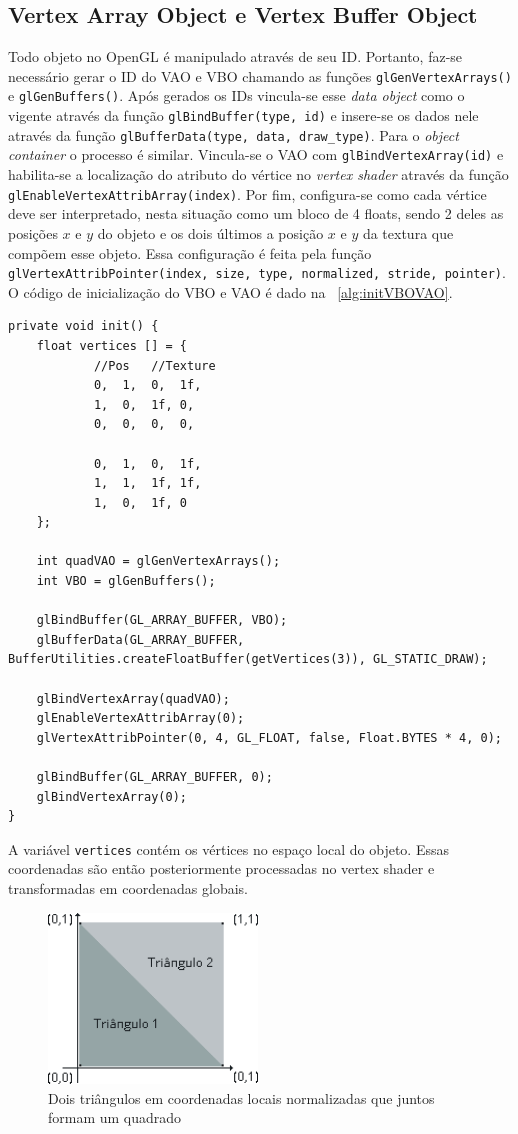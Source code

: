 \documentclass[12pt, 
openright, 
oneside, 
a4paper,    
brazil]{facom-ufu-abntex2}
\begin{document}
\subsection{Vertex Array Object e Vertex Buffer Object}
Todo objeto no OpenGL é manipulado através de seu ID. Portanto, faz-se necessário gerar o ID do VAO e VBO chamando as funções \texttt{glGenVertexArrays()} e \linebreak \texttt{glGenBuffers()}. Após gerados os IDs vincula-se esse \textit{data object} como o vigente através da função \texttt{glBindBuffer}\texttt{(type, id)} e insere-se os dados nele através da função \texttt{glBufferData(type, data, draw_type)}. Para o \textit{object container} o processo é similar. Vincula-se o VAO com \texttt{glBindVertexArray(id)} e habilita-se a localização do atributo do vértice no \textit{vertex shader} através da função \texttt{glEnableVertexAttribArray(index)}. Por fim, configura-se como cada vértice deve ser interpretado, nesta situação como um bloco de 4 floats, sendo 2 deles as posições $x$ e $y$ do objeto e os dois últimos a posição $x$ e $y$ da textura que compõem esse objeto. Essa configuração é feita pela função \texttt{glVertexAttribPointer(index, size, type, normalized, stride, pointer)}. O código de inicialização do VBO e VAO é dado na \lstlistingname~\ref{alg:initVBOVAO}.

\begin{lstlisting}[caption=Inicialização do VBO e VAO, label={alg:initVBOVAO}]
private void init() {
	float vertices [] = {
			//Pos	//Texture
			0,	1,	0,	1f,
			1,	0,	1f,	0,
			0,	0,	0,	0,
			
			0,	1,	0,	1f,
			1,	1,	1f,	1f,
			1,	0,	1f,	0
	};
	
	int quadVAO = glGenVertexArrays();
	int VBO = glGenBuffers();
	
	glBindBuffer(GL_ARRAY_BUFFER, VBO);
	glBufferData(GL_ARRAY_BUFFER, BufferUtilities.createFloatBuffer(getVertices(3)), GL_STATIC_DRAW); 
	
	glBindVertexArray(quadVAO);
	glEnableVertexAttribArray(0);
	glVertexAttribPointer(0, 4, GL_FLOAT, false, Float.BYTES * 4, 0);
	
	glBindBuffer(GL_ARRAY_BUFFER, 0);
	glBindVertexArray(0);
}
\end{lstlisting}

A variável \texttt{vertices} contém os vértices no espaço local do objeto. Essas coordenadas são então posteriormente processadas no vertex shader e transformadas em coordenadas globais.
\begin{figure}[H]
	\centering
	\includegraphics[width=15em]{imagens/tringulosCompondoQuad.png}
	\caption{Dois triângulos em coordenadas locais normalizadas que juntos formam um quadrado}
\end{figure}
\end{document}
